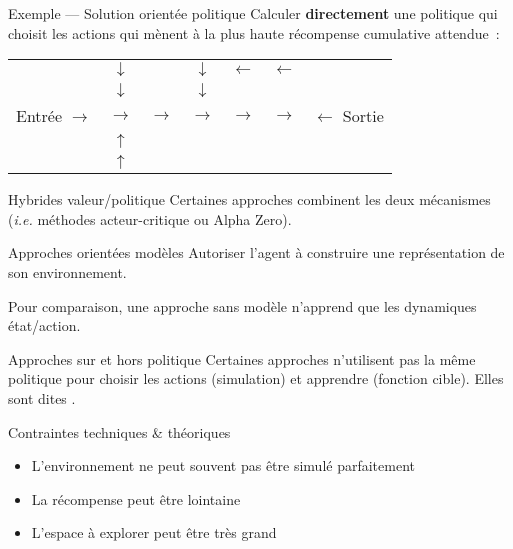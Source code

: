 \begin{frame}{Exemple --- Solution orientée politique}
  Calculer \textbf{directement} une politique qui choisit les actions qui mènent à la plus haute récompense cumulative attendue~:

  \begin{tabular}{c|c|c|c|c|c|c}
    \cline{2-6}
      & $\downarrow$ & \cellcolor{black} & $\downarrow$ & $\leftarrow$ & $\leftarrow$ & \\
      \cline{2-6}
      & $\downarrow$ & \cellcolor{black} & $\downarrow$ & \cellcolor{black} & \cellcolor{black} & \\
      \cline{2-6}
      Entrée $\rightarrow$ & $\rightarrow$ & $\rightarrow$ & $\rightarrow$ & $\rightarrow$ & $\rightarrow$ & $\leftarrow$ Sortie \\
      \cline{2-6}
      & $\uparrow$ & \cellcolor{black} & \cellcolor{black} & \cellcolor{black} & \cellcolor{black} & \\
      \cline{2-6}
      & $\uparrow$ & \cellcolor{black} & \cellcolor{black} & \cellcolor{black} & \cellcolor{black} & \\
      \cline{2-6}
  \end{tabular}
\end{frame}

\begin{frame}{Hybrides valeur/politique}
  Certaines approches combinent les deux mécanismes (\textit{i.e.} méthodes acteur-critique ou Alpha Zero).
\end{frame}

\begin{frame}{Approches orientées modèles}
  Autoriser l'agent à construire une représentation de son environnement.

  Pour comparaison, une approche sans modèle n'apprend que les dynamiques état/action.
\end{frame}

\begin{frame}{Approches sur et hors politique}
  Certaines approches n'utilisent pas la même politique pour choisir les actions (simulation) et apprendre (fonction cible). Elles sont dites .
\end{frame}

\begin{frame}{Contraintes techniques \& théoriques}
  \begin{itemize}[<+->]
    \item L'environnement ne peut souvent pas être simulé parfaitement
    \item La récompense peut être lointaine
    \item L'espace à explorer peut être très grand
  \end{itemize}
\end{frame}

